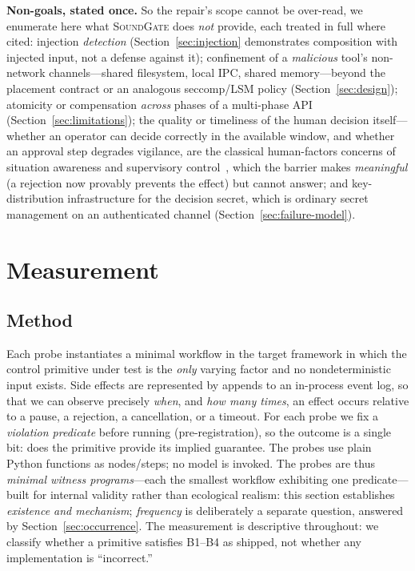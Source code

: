 \documentclass[10pt,journal,compsoc]{IEEEtran}
\newcommand{\sys}{\textsc{SoundGate}}
\begin{document}
\smallskip\noindent\textbf{Non-goals, stated once.} So the repair's scope
cannot be over-read, we enumerate here what \sys{} does \emph{not} provide,
each treated in full where cited: injection \emph{detection}
(Section~\ref{sec:injection} demonstrates composition with injected input,
not a defense against it); confinement of a \emph{malicious} tool's
non-network channels---shared filesystem, local IPC, shared memory---beyond
the placement contract or an analogous seccomp/LSM policy
(Section~\ref{sec:design}); atomicity or compensation \emph{across} phases of
a multi-phase API (Section~\ref{sec:limitations}); the quality or timeliness of the human decision itself---whether an operator can decide correctly in the available window, and whether an approval step degrades vigilance, are the classical human-factors concerns of situation awareness and supervisory control~\cite{parasuraman97,bainbridge83,endsley95,cummings04}, which the barrier makes \emph{meaningful} (a rejection now provably prevents the effect) but cannot answer; and key-distribution infrastructure for
the decision secret, which is ordinary secret management on an authenticated
channel (Section~\ref{sec:failure-model}).

\section{Measurement}
\label{sec:measurement}

\subsection{Method}
Each probe instantiates a minimal workflow in the target framework in which
the control primitive under test is the \emph{only} varying factor and no
nondeterministic input exists.
Side effects are represented by appends to an in-process event log, so that we
can observe precisely \emph{when}, and \emph{how many times}, an effect occurs
relative to a pause, a rejection, a cancellation, or a timeout. For each probe we
fix a \emph{violation predicate} before running (pre-registration), so the
outcome is a single bit: does the primitive provide its implied guarantee. The
probes use plain Python functions as nodes/steps; no model is invoked. The
probes are thus \emph{minimal witness programs}---each the smallest workflow
exhibiting one predicate---built for internal validity rather than ecological
realism: this section establishes \emph{existence and mechanism};
\emph{frequency} is deliberately a separate question, answered by
Section~\ref{sec:occurrence}. The measurement is descriptive throughout: we
classify whether a primitive satisfies B1--B4 as shipped, not whether any
implementation is ``incorrect.''
\end{document}

